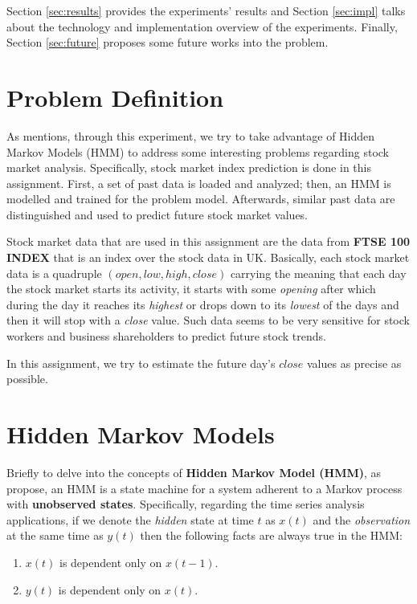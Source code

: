 \documentclass{acm_proc_article-sp}
\begin{document}
Section \ref{sec:results} provides the experiments' results and Section \ref{sec:impl} talks about the technology and
implementation overview of the experiments. Finally, Section \ref{sec:future} proposes some future works into the
problem.

\section{Problem Definition} \label{sec:pdef}
As \cite{erwin:pa4} mentions, through this experiment, we try to take advantage of Hidden Markov Models (HMM) to address
some interesting problems regarding stock market analysis. Specifically, stock market index prediction is done in this
assignment. First, a set of past data is loaded and analyzed; then, an HMM is modelled and trained for the problem
model. Afterwards, similar past data are distinguished and used to predict future stock market values.

Stock market data that are used in this assignment are the data from \textbf{FTSE 100 INDEX} that is an index over the
stock data in UK. Basically, each stock market data is a quadruple $(open, low, high, close)$ carrying the meaning that
each day the stock market starts its activity, it starts with some \textit{opening} after which during the day it
reaches its \textit{highest} or drops down to its \textit{lowest} of the days and then it will stop with a
\textit{close} value. Such data seems to be very sensitive for stock workers and business shareholders to predict
future stock trends.

In this assignment, we try to estimate the future day's $close$ values as precise as possible.

\section{Hidden Markov Models} \label{sec:hmm}
Briefly to delve into the concepts of \textbf{Hidden Markov Model (HMM)}, as
\cite{hassan:phd_ths,hassan:hmm_stock,blunsom:hmm_tut,wiki:hmm} propose, an HMM is a state machine
for a system adherent to a Markov process with \textbf{unobserved states}. Specifically, regarding
the time series analysis applications, if we denote the \textit{hidden} state at time $t$ as $x(t)$
and the \textit{observation} at the same time as $y(t)$ then the following facts are always true in the HMM:
\begin{enumerate}
  \item $x(t)$ is dependent only on $x(t-1)$.
  \item $y(t)$ is dependent only on $x(t)$.
\end{enumerate}
\end{document}

